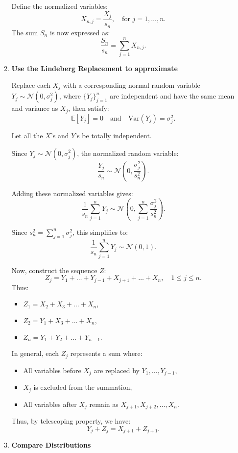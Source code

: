\begin{itemize}
\begin{enumerate}
        Define the normalized variables:
\[
X_{n,j} = \frac{X_j}{s_n}, \quad \text{for } j = 1, \dots, n.
\]
The sum \( S_n \) is now expressed as:
\[
\frac{S_n}{s_n} = \sum_{j=1}^n X_{n,j}.
\]

\item \textbf{Use the Lindeberg Replacement to approximate}

Replace each \( X_j \) with a corresponding normal random variable \( Y_j \sim \mathcal{N}(0, \sigma_j^2) \), where \( \{Y_j\}_{j=1}^n \) are independent and have the same mean and variance as \( X_j \), then satisfy:
\[
\mathbb{E}[Y_j] = 0 \quad \text{and} \quad \text{Var}(Y_j) = \sigma_j^2.
\]

Let all the \( X\)'s and \( Y\)'s be totally independent. 

Since  \( Y_j \sim \mathcal{N}(0, \sigma_j^2) \), the normalized random variable:
\[
\frac{Y_j}{s_n} \sim \mathcal{N}\left(0, \frac{\sigma_j^2}{s_n^2}\right).
\]

Adding these normalized variables gives:
\[
\frac{1}{s_n} \sum_{j=1}^n Y_j \sim \mathcal{N}\left(0, \sum_{j=1}^n \frac{\sigma_j^2}{s_n^2}\right).
\]

Since \( s_n^2 = \sum_{j=1}^n \sigma_j^2 \), this simplifies to:
\[
\frac{1}{s_n} \sum_{j=1}^n Y_j \sim \mathcal{N}(0, 1).
\]

Now, construct the sequence \( Z\):
\[
Z_j = Y_1 + \dots + Y_{j-1} + X_{j + 1} + \dots + X_n, \quad 1 \leq j \leq n.
\]
Thus:
\begin{itemize}
    \item[] \( Z_1 = X_2 + X_3 + \dots + X_n \),
    \item[] \( Z_2 = Y_1 + X_3 + \dots + X_n \),
    \item[] \( Z_n = Y_1 + Y_2 + \dots + Y_{n-1} \).
\end{itemize}

In general, each \( Z_j \) represents a sum where:
\begin{itemize}
    \item All variables before \( X_j \) are replaced by \( Y_1, \dots, Y_{j-1} \),
    \item \( X_j \) is excluded from the summation,
    \item All variables after \( X_j \) remain as \( X_{j+1}, X_{j+2}, \dots, X_n \).
\end{itemize}

Thus, by telescoping property, we have:
\[
Y_j + Z_j = X_{j+1} + Z_{j+1}.
\]

\item \textbf{Compare Distributions}


\end{enumerate}
\end{itemize}
